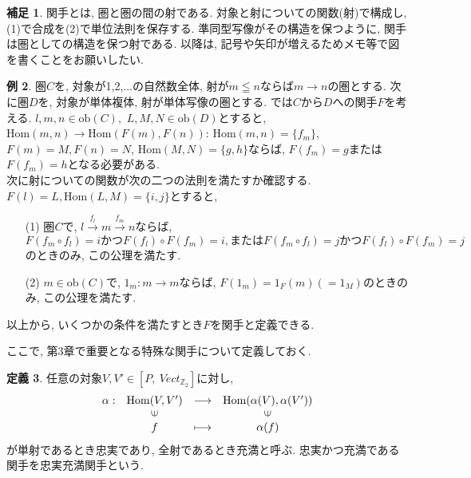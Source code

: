 \documentclass[a4paper]{jsarticle}
\theoremstyle{definition}
\newtheorem{dfn}{定義}[section]
\newtheorem{exam}[dfn]{例}
\newtheorem{hsk}[dfn]{補足}
\newcommand{\Fun}[2]{[#1,~#2]}
\newcommand{\Hom}{{\mathrm{Hom}}}
\newcommand{\ob}{{\mathrm{ob}}}
\begin{document}
\begin{hsk}
    関手とは, 圏と圏の間の射である. 対象と射についての関数(射)で構成し, (1)で合成を(2)で単位法則を保存する. 準同型写像がその構造を保つように, 関手は圏としての構造を保つ射である. 以降は, 記号や矢印が増えるためメモ等で図を書くことをお願いしたい.\\
\end{hsk}
\begin{exam}
    圏$C$を, 対象が1,2,...の自然数全体, 射が$m\leqq n$ならば$m \rightarrow n$の圏とする. 次に圏$D$を, 対象が単体複体, 射が単体写像の圏とする. では$C$から$D$への関手$F$を考える. $l, m, n\in\ob (C), $ $ L, M, N\in\ob(D)$とすると,\\ 
    $\Hom (m, n)\rightarrow \Hom (F(m), F(n))$: $\Hom (m, n)=\{f_m\}$, $F(m)=M, F(n)=N$, $\Hom (M, N)=\{g, h\}$ならば, $F(f_m)=g$または$F(f_m)=h$となる必要がある.\\
    次に射についての関数が次の二つの法則を満たすか確認する.\\
    $F(l)=L, \Hom (L, M)=\{i,j\}$とすると, 
    
    \begin{itemize}
        \item[(1)] 圏$C$で, $l\stackrel{f_l}{\to} m\stackrel{f_m}{\to} n$ならば, $F(f_m\circ f_l) =i かつ F(f_l)\circ F(f_m) = i, またはF(f_m\circ f_l) =j かつ F(f_l)\circ F(f_m) = j$のときのみ, この公理を満たす.
        \item [(2)] $m\in$ob$(C)$で, $1_m:m\rightarrow m$ならば, $F(1_m) = 1_F(m)(=1_M)$のときのみ, この公理を満たす.
    \end{itemize}
    以上から, いくつかの条件を満たすとき$F$を関手と定義できる.
\end{exam}

ここで, 第3章で重要となる特殊な関手について定義しておく.
\begin{dfn}
    任意の対象$V, V'\in\Fun{P}{Vect_{\mathbb{Z}_2}}$に対し, 
\begin{equation}
    \begin{array}{cccc}
         \alpha:& \Hom(V, V') & \longrightarrow & \Hom(\alpha(V), \alpha(V')) \\
        & \rotatebox{90}{$\in$} & & \rotatebox{90}{$\in$} \\
        & f & \longmapsto & \alpha(f)\notag
    \end{array}
\end{equation}
が単射であるとき忠実であり, 全射であるとき充満と呼ぶ. 忠実かつ充満である関手を忠実充満関手という.\\
\end{dfn}
\end{document}
